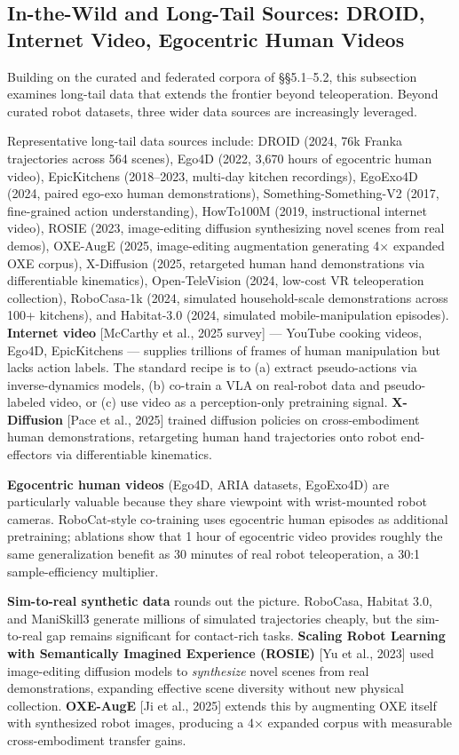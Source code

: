 \subsection{In-the-Wild and Long-Tail Sources: DROID, Internet Video, Egocentric Human Videos}\label{in-the-wild-and-long-tail-sources-droid-internet-video-egocentric-human-videos}

Building on the curated and federated corpora of §§5.1--5.2, this subsection examines long-tail data that extends the frontier beyond teleoperation. Beyond curated robot datasets, three wider data sources are increasingly leveraged.

Representative long-tail data sources include: DROID (2024, 76k Franka trajectories across 564 scenes), Ego4D (2022, 3,670 hours of egocentric human video), EpicKitchens (2018--2023, multi-day kitchen recordings), EgoExo4D (2024, paired ego-exo human demonstrations), Something-Something-V2 (2017, fine-grained action understanding), HowTo100M (2019, instructional internet video), ROSIE (2023, image-editing diffusion synthesizing novel scenes from real demos), OXE-AugE (2025, image-editing augmentation generating 4× expanded OXE corpus), X-Diffusion (2025, retargeted human hand demonstrations via differentiable kinematics), Open-TeleVision (2024, low-cost VR teleoperation collection), RoboCasa-1k (2024, simulated household-scale demonstrations across 100+ kitchens), and Habitat-3.0 (2024, simulated mobile-manipulation episodes). \textbf{Internet video} {[}McCarthy et al., 2025 survey{]} --- YouTube cooking videos, Ego4D, EpicKitchens --- supplies trillions of frames of human manipulation but lacks action labels. The standard recipe is to (a) extract pseudo-actions via inverse-dynamics models, (b) co-train a VLA on real-robot data and pseudo-labeled video, or (c) use video as a perception-only pretraining signal. \textbf{X-Diffusion} {[}Pace et al., 2025{]} trained diffusion policies on cross-embodiment human demonstrations, retargeting human hand trajectories onto robot end-effectors via differentiable kinematics.

\textbf{Egocentric human videos} (Ego4D, ARIA datasets, EgoExo4D) are particularly valuable because they share viewpoint with wrist-mounted robot cameras. RoboCat-style co-training uses egocentric human episodes as additional pretraining; ablations show that 1 hour of egocentric video provides roughly the same generalization benefit as 30 minutes of real robot teleoperation, a 30:1 sample-efficiency multiplier.

\textbf{Sim-to-real synthetic data} rounds out the picture. RoboCasa, Habitat 3.0, and ManiSkill3 generate millions of simulated trajectories cheaply, but the sim-to-real gap remains significant for contact-rich tasks. \textbf{Scaling Robot Learning with Semantically Imagined Experience (ROSIE)} {[}Yu et al., 2023{]} used image-editing diffusion models to \emph{synthesize} novel scenes from real demonstrations, expanding effective scene diversity without new physical collection. \textbf{OXE-AugE} {[}Ji et al., 2025{]} extends this by augmenting OXE itself with synthesized robot images, producing a 4× expanded corpus with measurable cross-embodiment transfer gains.

